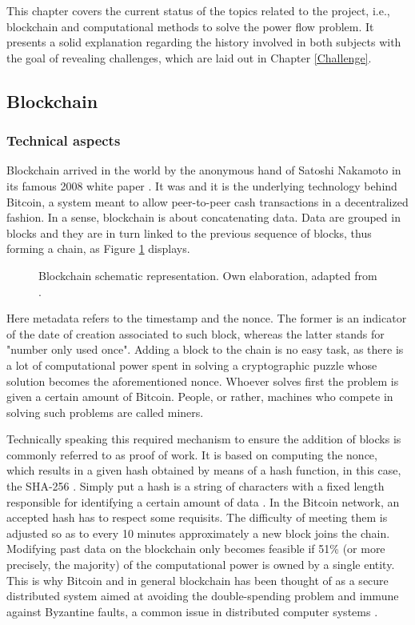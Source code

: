 This chapter covers the current status of the topics related to the project, i.e., blockchain and computational methods to solve the power flow problem. It presents a solid explanation regarding the history involved in both subjects with the goal of revealing challenges, which are laid out in Chapter \ref{Challenge}.

\subsection{Blockchain}
\subsubsection{Technical aspects}
Blockchain arrived in the world by the anonymous hand of Satoshi Nakamoto in its famous 2008 white paper \cite{nakamoto2008re}. It was and it is the underlying technology behind Bitcoin, a system meant to allow peer-to-peer cash transactions in a decentralized fashion. In a sense, blockchain is about concatenating data. Data are grouped in blocks and they are in turn linked to the previous sequence of blocks, thus forming a chain, as Figure \ref{fig:block1} displays. 

\begin{figure}[!htb]\centering
    \caption{Blockchain schematic representation. Own elaboration, adapted from \cite{nofer2017blockchain, zheng2018blockchain}.}
    \label{fig:block1}
\end{figure}
Here metadata refers to the timestamp and the nonce. The former is an indicator of the date of creation associated to such block, whereas the latter stands for "number only used once". Adding a block to the chain is no easy task, as there is a lot of computational power spent in solving a cryptographic puzzle whose solution becomes the aforementioned nonce. Whoever solves first the problem is given a certain amount of Bitcoin. People, or rather, machines who compete in solving such problems are called miners. 

Technically speaking this required mechanism to ensure the addition of blocks is commonly referred to as proof of work. It is based on computing the nonce, which results in a given hash obtained by means of a hash function, in this case, the SHA-256 \cite{nakamoto2008re, gupta2017blockchain}. Simply put a hash is a string of characters with a fixed length responsible for identifying a certain amount of data \cite{di2017blockchain}. In the Bitcoin network, an accepted hash has to respect some requisits. The difficulty of meeting them is adjusted so as to every 10 minutes approximately a new block joins the chain. Modifying past data on the blockchain only becomes feasible if 51\% (or more precisely, the majority) of the computational power is owned by a single entity. This is why Bitcoin and in general blockchain has been thought of as a secure distributed system aimed at avoiding the double-spending problem and immune against Byzantine faults, a common issue in distributed computer systems \cite{sankar2017survey, miller2014anonymous}. 

